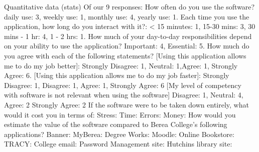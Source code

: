 Quantitative data (stats)
Of our 9 responses: %
How often do you use the software? daily use: 3, weekly use: 1, monthly use: 4, yearly use: 1.
Each time you use the  application, how long do you interact with it?: < 15 minutes: 1, 15-30 mins: 3, 30 mins - 1 hr: 4, 1 - 2 hrs: 1.
How much of your day-to-day responsibilities depend on your ability to use the  application? Important: 4, Essential: 5.
How much do you agree with each of the following statements?
[Using this application allows me to do my job better]: Strongly Disagree: 1, Neutral: 1,Agree: 1, Strongly Agree: 6.
[Using this application allows me to do my job faster]: Strongly Disagree: 1, Disagree: 1, Agree: 1, Strongly Agree: 6
[My level of competency with software is not relevant when using the software] Disagree: 1, Neutral: 4, Agree: 2 Strongly Agree: 2
If the software were to be taken down entirely, what would it cost you in terms of:
Stress:
Time:
Errors:
Money:
How would you estimate the value of the software compared to Berea College's following applications?
Banner:
MyBerea:
Degree Works:
Moodle:
Online Bookstore:
TRACY:
College email:
Password Management site:
Hutchins library site:
